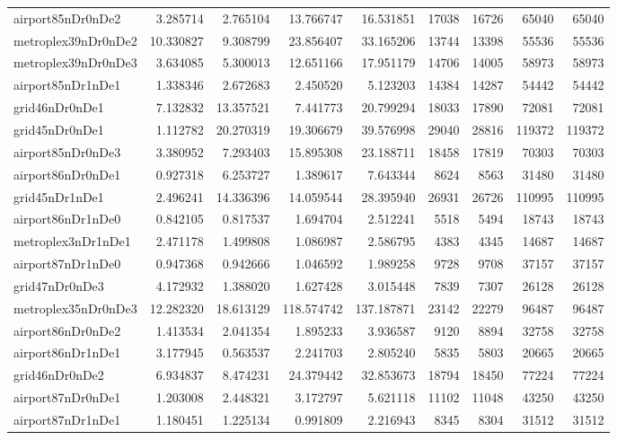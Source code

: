 \begin{longtable}{|l|r|r|r|r|r|r|r|r|}
airport85nDr0nDe2 & 3.285714 & 2.765104 & 13.766747 & 16.531851 & 17038 & 16726 & 65040 & 65040 \\
metroplex39nDr0nDe2 & 10.330827 & 9.308799 & 23.856407 & 33.165206 & 13744 & 13398 & 55536 & 55536 \\
metroplex39nDr0nDe3 & 3.634085 & 5.300013 & 12.651166 & 17.951179 & 14706 & 14005 & 58973 & 58973 \\
airport85nDr1nDe1 & 1.338346 & 2.672683 & 2.450520 & 5.123203 & 14384 & 14287 & 54442 & 54442 \\
grid46nDr0nDe1 & 7.132832 & 13.357521 & 7.441773 & 20.799294 & 18033 & 17890 & 72081 & 72081 \\
grid45nDr0nDe1 & 1.112782 & 20.270319 & 19.306679 & 39.576998 & 29040 & 28816 & 119372 & 119372 \\
airport85nDr0nDe3 & 3.380952 & 7.293403 & 15.895308 & 23.188711 & 18458 & 17819 & 70303 & 70303 \\
airport86nDr0nDe1 & 0.927318 & 6.253727 & 1.389617 & 7.643344 & 8624 & 8563 & 31480 & 31480 \\
grid45nDr1nDe1 & 2.496241 & 14.336396 & 14.059544 & 28.395940 & 26931 & 26726 & 110995 & 110995 \\
airport86nDr1nDe0 & 0.842105 & 0.817537 & 1.694704 & 2.512241 & 5518 & 5494 & 18743 & 18743 \\
metroplex3nDr1nDe1 & 2.471178 & 1.499808 & 1.086987 & 2.586795 & 4383 & 4345 & 14687 & 14687 \\
airport87nDr1nDe0 & 0.947368 & 0.942666 & 1.046592 & 1.989258 & 9728 & 9708 & 37157 & 37157 \\
grid47nDr0nDe3 & 4.172932 & 1.388020 & 1.627428 & 3.015448 & 7839 & 7307 & 26128 & 26128 \\
metroplex35nDr0nDe3 & 12.282320 & 18.613129 & 118.574742 & 137.187871 & 23142 & 22279 & 96487 & 96487 \\
airport86nDr0nDe2 & 1.413534 & 2.041354 & 1.895233 & 3.936587 & 9120 & 8894 & 32758 & 32758 \\
airport86nDr1nDe1 & 3.177945 & 0.563537 & 2.241703 & 2.805240 & 5835 & 5803 & 20665 & 20665 \\
grid46nDr0nDe2 & 6.934837 & 8.474231 & 24.379442 & 32.853673 & 18794 & 18450 & 77224 & 77224 \\
airport87nDr0nDe1 & 1.203008 & 2.448321 & 3.172797 & 5.621118 & 11102 & 11048 & 43250 & 43250 \\
airport87nDr1nDe1 & 1.180451 & 1.225134 & 0.991809 & 2.216943 & 8345 & 8304 & 31512 & 31512 \\

\end{longtable}
